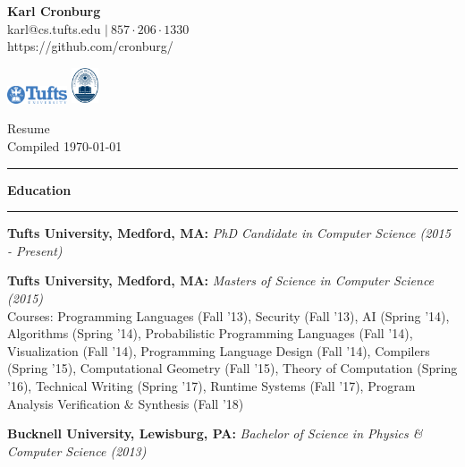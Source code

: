\documentclass{article}
\begin{document}
\begin{minipage}{.333 \linewidth}
{\Large {\bf Karl Cronburg}\\
{\small karl@cs.tufts.edu $\vert~857\cdot206\cdot1330$}\\
{\footnotesize https://github.com/cronburg/}}
\end{minipage}
\begin{minipage}{.333 \linewidth}
\begin{center}
\includegraphics[width=67px, height=20px]{tufts-logo.png}\hspace{1cm}
\includegraphics[width=30px, height=40px]{bucknell-seal.png}
\end{center}
\end{minipage}
\begin{minipage}{.333 \linewidth}
{\footnotesize \hspace*{\fill}Resume\\
\hspace*{\fill}Compiled \mydate \today}%
\end{minipage}

\rule{\linewidth}{1pt}

{\large\bf Education}\\[-.3cm]
\rule{\linewidth}{.5pt}
\begin{minipage}{\linewidth}

{\bf Tufts University, Medford, MA:}
{\it PhD Candidate in Computer Science (2015 - Present)}

{\bf Tufts University, Medford, MA:}
{\it Masters of Science in Computer Science (2015)}\\
Courses: Programming Languages (Fall '13), Security (Fall '13), AI (Spring
'14), Algorithms (Spring '14), Probabilistic Programming Languages (Fall '14),
Visualization (Fall '14), Programming Language Design (Fall '14), Compilers
(Spring '15), Computational Geometry (Fall '15), Theory of Computation (Spring
'16), Technical Writing (Spring '17), Runtime Systems (Fall '17), Program
Analysis Verification \& Synthesis (Fall '18)

{\bf Bucknell University, Lewisburg, PA:}
{\it Bachelor of Science in Physics \& Computer Science (2013)}\\
\end{minipage}
\end{document}
